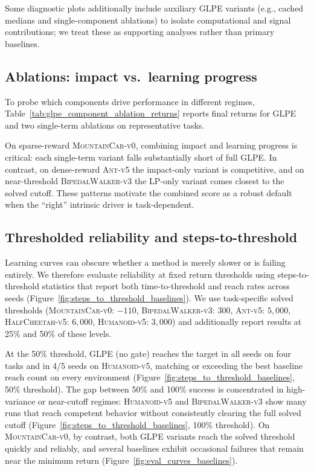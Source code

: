 Some diagnostic plots additionally include auxiliary GLPE variants (e.g., cached medians and single-component ablations) to isolate computational and signal contributions; we treat these as supporting analyses rather than primary baselines.




\subsection{Ablations: impact vs.\ learning progress}

To probe which components drive performance in different regimes, Table~\ref{tab:glpe_component_ablation_returns} reports final returns for GLPE and two single-term ablations on representative tasks.

On sparse-reward \textsc{MountainCar-v0}, combining impact and learning progress is critical: each single-term variant falls substantially short of full GLPE.
In contrast, on dense-reward \textsc{Ant-v5} the impact-only variant is competitive, and on near-threshold \textsc{BipedalWalker-v3} the LP-only variant comes closest to the solved cutoff.
These patterns motivate the combined score as a robust default when the ``right'' intrinsic driver is task-dependent.



\subsection{Thresholded reliability and steps-to-threshold}

Learning curves can obscure whether a method is merely slower or is failing entirely.
We therefore evaluate reliability at fixed return thresholds using steps-to-threshold statistics that report both time-to-threshold and reach rates across seeds (Figure~\ref{fig:steps_to_threshold_baselines}).
We use task-specific solved thresholds (\textsc{MountainCar-v0}: $-110$, \textsc{BipedalWalker-v3}: $300$, \textsc{Ant-v5}: $5{,}000$, \textsc{HalfCheetah-v5}: $6{,}000$, \textsc{Humanoid-v5}: $3{,}000$) and additionally report results at 25\% and 50\% of these levels.



At the 50\% threshold, GLPE (no gate) reaches the target in all seeds on four tasks and in 4/5 seeds on \textsc{Humanoid-v5}, matching or exceeding the best baseline reach count on every environment (Figure~\ref{fig:steps_to_threshold_baselines}, 50\% threshold).
The gap between 50\% and 100\% success is concentrated in high-variance or near-cutoff regimes: \textsc{Humanoid-v5} and \textsc{BipedalWalker-v3} show many runs that reach competent behavior without consistently clearing the full solved cutoff (Figure~\ref{fig:steps_to_threshold_baselines}, 100\% threshold).
On \textsc{MountainCar-v0}, by contrast, both GLPE variants reach the solved threshold quickly and reliably, and several baselines exhibit occasional failures that remain near the minimum return (Figure~\ref{fig:eval_curves_baselines}).

